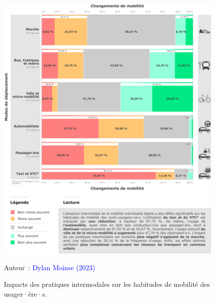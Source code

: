 \begin{refsegment}
    \begin{figure}[h!]\vspace*{4pt}
        \caption{Impacts des pratiques intermodales sur les habitudes de mobilité des usager·ère·s.}
        \label{fig-chap4:impacts-adoption-autres-modes}
        \centerline{\includegraphics[width=1\columnwidth]{src/Figures/Chap-4/FR_Substitution_modale.pdf}}
        \vspace{5pt}
        \begin{flushright}\scriptsize{
        Auteur~: \textcolor{blue}{Dylan Moinse (2023)}
        }\end{flushright}
    \end{figure}


\end{refsegment}
